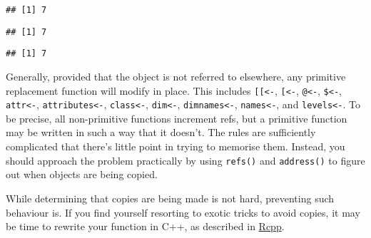 \begin{verbatim}
## [1] 7
\end{verbatim}

\begin{Shaded}
\begin{Highlighting}[]
\StringTok{ }
\StringTok{ }

\StringTok{ }\OperatorTok{:}\NormalTok{; }
\end{Highlighting}
\end{Shaded}

\begin{verbatim}
## [1] 7
\end{verbatim}

\begin{Shaded}
\begin{Highlighting}[]
\StringTok{ }\OperatorTok{:}\NormalTok{; }
\end{Highlighting}
\end{Shaded}

\begin{verbatim}
## [1] 7
\end{verbatim}

Generally, provided that the object is not referred to elsewhere, any
primitive replacement function will modify in place. This includes
\texttt{{[}{[}\textless{}-}, \texttt{{[}\textless{}-},
\texttt{@\textless{}-}, \texttt{\$\textless{}-},
\texttt{attr\textless{}-}, \texttt{attributes\textless{}-},
\texttt{class\textless{}-}, \texttt{dim\textless{}-},
\texttt{dimnames\textless{}-}, \texttt{names\textless{}-}, and
\texttt{levels\textless{}-}. To be precise, all non-primitive functions
increment refs, but a primitive function may be written in such a way
that it doesn't. The rules are sufficiently complicated that there's
little point in trying to memorise them. Instead, you should approach
the problem practically by using \texttt{refs()} and \texttt{address()}
to figure out when objects are being copied.

While determining that copies are being made is not hard, preventing
such behaviour is. If you find yourself resorting to exotic tricks to
avoid copies, it may be time to rewrite your function in C++, as
described in \protect\hyperlink{rcpp}{Rcpp}.

